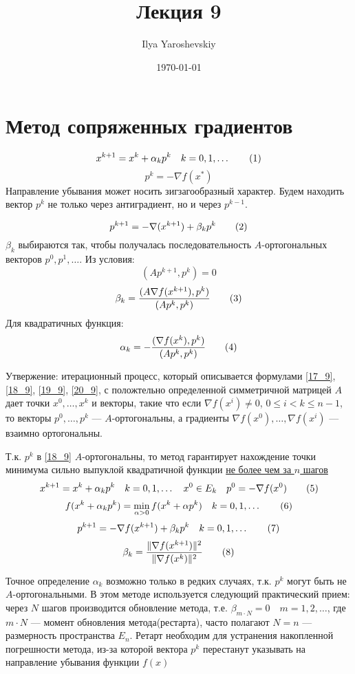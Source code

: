 \documentclass[english]{article}
\author{Ilya Yaroshevskiy}
\date{\today}
\title{Лекция 9}
\newcommand\addtag{\refstepcounter{equation}\tag{\theequation}}
\theoremstyle{plain}
\theoremstyle{remark}
\theoremstyle{definition}
\begin{document}
\maketitle
\tableofcontents


\section{Метод сопряженных градиентов}
\label{sec:org629e8da}
\[ x^{k + 1} = x^k + \alpha_k p^k \quad k = 0,1,\dots \addtag\label{17_9}\]
\[ p^k = - \nabla f(x^*) \]
Направление убывания может носить зигзагообразный характер. Будем находить вектор \(p^k\) не только через антиградиент, но и через \(p^{k - 1}\).

\[ p^{k + 1} = - \nabla(x^{k + 1}) + \beta_k p^k \addtag\label{18_9}\]
\(\beta_k\) выбираются так, чтобы получалась последовательность \(A\)-ортогональных векторов \(p^0, p^1, \dots\). Из условия:
\[ (Ap^{k + 1}, p^k) = 0 \]
\[ \beta_k = \frac{(A \nabla f(x^{k + 1}), p^k)}{(Ap^k, p^k)} \addtag\label{19_9}\]
Для квадратичных функция:
\[ \alpha_k = -\frac{(\nabla f(x^k), p^k)}{(Ap^k, p^k)} \addtag\label{20_9}\]

Утвержение: итерационный процесс, который описывается формулами \ref{17_9}, \ref{18_9}, \ref{19_9}, \ref{20_9}, с положтельно определенной симметричной матрицей \(A\) дает точки \(x^0,\dots,x^k\) и векторы, такие что если \(\nabla f(x^i) \neq 0\), \(0 \le i < k \le n - 1\), то векторы \(p^0,\dots,p^k\) --- \(A\)-ортогональны, а градиенты \(\nabla f(x^0), \dots, \nabla f(x^i)\) --- взаимно ортогональны.

Т.к. \(p^k\) в \ref{18_9} \(A\)-ортогональны, то метод гарантирует нахождение точки минимума сильно выпуклой квадратичной функции \uline{не более чем за \(n\) шагов}
\[ x^{k + 1} = x^k + \alpha_k p^k \quad k = 0,1,\dots\quad x^0 \in E_k\quad p^0 = - \nabla f(x^0) \addtag\label{21_9}\]
\[ f(x^k + \alpha_k p^k) = \min_{\alpha > 0} f(x^k + \alpha p^k)\quad k = 0,1, \dots \addtag\label{22_9}\]
\[ p^{k + 1} = -\nabla f(x^{k + 1}) + \beta_k p^k\quad k = 0,1,\dots \addtag\label{23_9}\]
\[ \beta_k = \frac{\Vert \nabla f(x^{k + 1}) \Vert ^2}{\Vert \nabla f(x^k) \Vert ^2} \addtag\label{24_9}\]

Точное определение \(\alpha_k\) возможно только в редких случаях, т.к. \(p^k\) могут быть не \(A\)-ортогональными. В этом методе используется следующий практический прием: через \(N\) шагов производится обновление метода, т.е. \(\beta_{m\cdot N} = 0\quad m = 1, 2, \dots\), где \(m\cdot N\) --- момент обновления метода(рестарта), часто полагают \(N = n\) --- размерность пространства \(E_n\). Ретарт необходим для устранения накопленной погрешности метода, из-за которой вектора \(p^k\) перестанут указывать на направление убывания функции \(f(x)\) 
\end{document}
